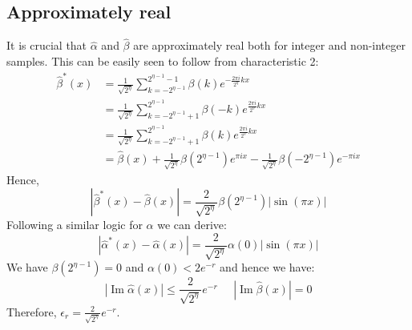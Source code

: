 \documentclass[aps,floatfix,10pt,amssymb,amsfont,amsmath,superscriptaddress,float,nofootinbib,longbibliography,nobalancelastpage,twocolumn]{revtex4-2}
\begin{document}
\subsection{Approximately real}
\label{section:approxiamtely_real}
It is crucial that $\hat \alpha$ and $\hat \beta$ are approximately real both for integer and non-integer samples. This can be easily seen to follow from characteristic 2:
\begin{align}
    \hat\beta^*(x) &=\frac{1}{\sqrt{2^{\eta}}}\sum_{k=-2^{\eta-1}}^{2^{\eta-1}-1} \beta(k)e^{-\frac{2\pi i}{2^{\eta}}kx}\\
    &=\frac{1}{\sqrt{2^{\eta}}}\sum_{k=-2^{\eta-1}+1}^{2^{\eta-1}} \beta(-k)e^{\frac{2\pi i}{2^{\eta}}kx}\\
    &=\frac{1}{\sqrt{2^{\eta}}}\sum_{k=-2^{\eta-1}+1}^{2^{\eta-1}} \beta(k)e^{\frac{2\pi i}{2^{\eta}}kx}\\
    &=\hat \beta(x) + \frac{1}{\sqrt{2^{\eta}}}\beta(2^{\eta-1})e^{\pi i x} - \frac{1}{\sqrt{2^{\eta}}}\beta(-2^{\eta-1})e^{-\pi i x}
\end{align}
Hence,
\begin{equation}
    |\hat\beta^*(x)- \hat\beta(x)| =  \frac{2}{\sqrt{2^{\eta}}}\beta(2^{\eta-1})|\sin (\pi x)|
\end{equation}
Following a similar logic for $\alpha$ we can derive:
\begin{equation}
        |\hat\alpha^*(x)- \hat\alpha(x)| =  \frac{2}{\sqrt{2^{\eta}}}\alpha(0)|\sin (\pi x)|
\end{equation}
We have $\beta(2^{\eta-1}) =0$ and $\alpha(0) < 2e^{-r}$ and hence we have:
\begin{equation}
    \label{eq:imagscaling}|\operatorname{Im}\hat\alpha(x)| \leq \frac{2}{\sqrt{2^{\eta}}}e^{-r} \;\;\;\;\;|\operatorname{Im}\hat\beta(x)| = 0
\end{equation}
Therefore, $\epsilon_r = \frac{2}{\sqrt{2^{\eta}}}e^{-r}$.
\end{document}
